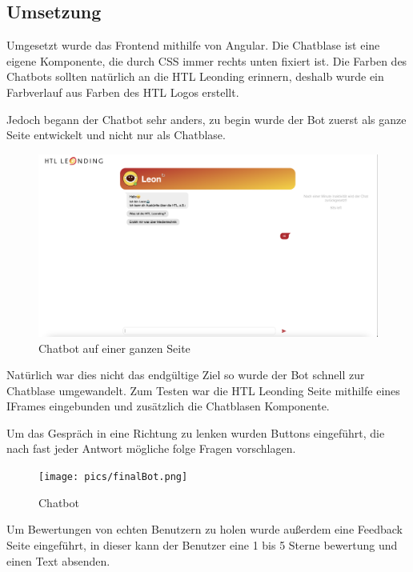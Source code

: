 \subsection{Umsetzung}
Umgesetzt wurde das Frontend mithilfe von Angular. Die Chatblase ist eine eigene Komponente, die durch CSS immer rechts unten fixiert ist. Die Farben des Chatbots sollten natürlich an die HTL Leonding erinnern, deshalb wurde ein Farbverlauf aus Farben des HTL Logos erstellt.

Jedoch begann der Chatbot sehr anders, zu begin wurde der Bot zuerst als ganze Seite entwickelt und nicht nur als Chatblase.
\begin{figure}[hbt!]
    \centering
    \includegraphics[scale=0.2]{pics/fullPageBot.png}
    \caption{Chatbot auf einer ganzen Seite}
    \label{fig:impl:conceptBotFullPage}
\end{figure}

Natürlich war dies nicht das endgültige Ziel so wurde der Bot schnell zur Chatblase umgewandelt.
Zum Testen war die HTL Leonding Seite mithilfe eines IFrames eingebunden und zusätzlich die Chatblasen Komponente.

Um das Gespräch in eine Richtung zu lenken wurden Buttons eingeführt, die nach fast jeder Antwort mögliche folge Fragen vorschlagen.

\begin{figure}[hbt!]
    \centering
    \texttt{[image: pics/finalBot.png]}
    \caption{Chatbot}
    \label{fig:impl:bot}
\end{figure}

Um Bewertungen von echten Benutzern zu holen wurde außerdem eine Feedback Seite eingeführt, in dieser kann der Benutzer eine 1 bis 5 Sterne bewertung und einen Text absenden.

